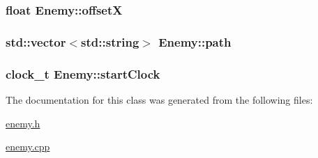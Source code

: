 \subsubsection[{offset\+X}]{\setlength{\rightskip}{0pt plus 5cm}float Enemy\+::offset\+X\hspace{0.3cm}{\ttfamily [private]}}\label{classEnemy_a787010c7b6adf5f5e9bd1247481a4317}
\hypertarget{classEnemy_aa640767f1de0eadece8f9ef7e5566358}{}
\subsubsection[{path}]{\setlength{\rightskip}{0pt plus 5cm}std\+::vector$<$std\+::string$>$ Enemy\+::path\hspace{0.3cm}{\ttfamily [private]}}\label{classEnemy_aa640767f1de0eadece8f9ef7e5566358}
\hypertarget{classEnemy_a662651639455161e84802d40fdd31475}{}
\subsubsection[{start\+Clock}]{\setlength{\rightskip}{0pt plus 5cm}clock\+\_\+t Enemy\+::start\+Clock\hspace{0.3cm}{\ttfamily [private]}}\label{classEnemy_a662651639455161e84802d40fdd31475}


The documentation for this class was generated from the following files\+:\begin{DoxyCompactItemize}
\item 
\hyperlink{enemy_8h}{enemy.\+h}\item 
\hyperlink{enemy_8cpp}{enemy.\+cpp}\end{DoxyCompactItemize}
